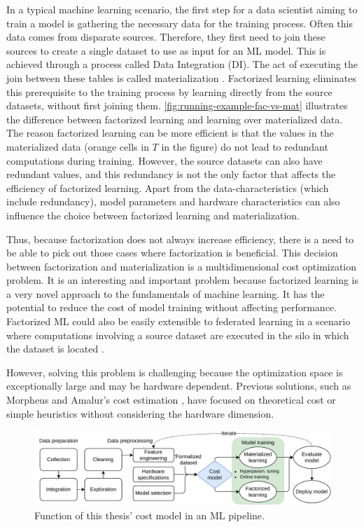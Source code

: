 In a typical machine learning scenario, the first step for a data scientist aiming to train a model is gathering the necessary data for the training process. Often this data comes from disparate sources. Therefore, they first need to join these sources to create a single dataset to use as input for an ML model. This is achieved through a process called Data Integration (DI). The act of executing the join between these tables is called materialization \cite{rel_db_glossary}. Factorized learning eliminates this prerequisite to the training process by learning directly from the source datasets, without first joining them. \autoref{fig:running-example-fac-vs-mat} illustrates the difference between factorized learning and learning over materialized data. The reason factorized learning can be more efficient is that the values in the materialized data (orange cells in $T$ in the figure) do not lead to redundant computations during training. However, the source datasets can also have redundant values, and this redundancy is not the only factor that affects the efficiency of factorized learning. Apart from the data-characteristics (which include redundancy), model parameters and hardware characteristics can also influence the choice between factorized learning and materialization.

Thus, because factorization does not always increase efficiency, there is a need to be able to pick out those cases where factorization is beneficial. This decision between factorization and materialization is a multidimensional cost optimization problem. It is an interesting and important problem because factorized learning is a very novel approach to the fundamentals of machine learning. It has the potential to reduce the cost of model training without affecting performance. Factorized ML could also be easily extensible to federated learning in a scenario where computations involving a source dataset are executed in the silo in which the dataset is located \cite{amalur}.

However, solving this problem is challenging because the optimization space is exceptionally large and may be hardware dependent. Previous solutions, such as Morpheus \cite{morpheus} and Amalur's cost estimation \cite{schijndel_cost_estimation}, have focused on theoretical cost or simple heuristics without considering the hardware dimension.

\begin{figure}[h]
    \centering
    \includegraphics[width=0.95\linewidth]{chapters/01_introduction/figures/ML-Pipeline.pdf}
    \caption{Function of this thesis' cost model in an ML pipeline.}
    \label{fig:ml-pipeline}
\end{figure}

